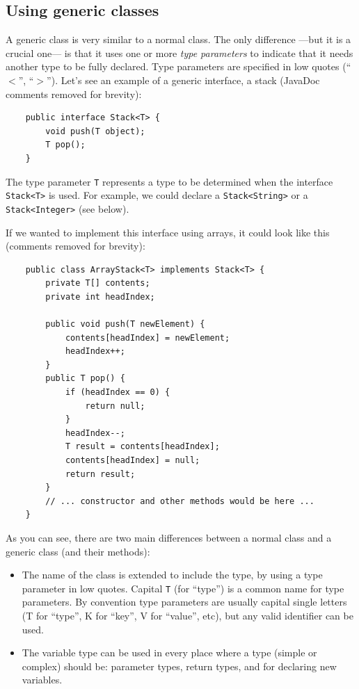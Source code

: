 \subsection{Using generic classes}
\label{sec:using-gener-class}

A generic class is very similar to a normal class. The only
difference ---but it is a crucial one--- is that it uses one or more
\emph{type parameters} to indicate that it needs another type to be
fully declared. Type parameters
are specified in low quotes (``$<$'', ``$>$''). Let's see an
example of a generic interface, a stack (JavaDoc comments removed for
brevity): 

\begin{verbatim}
    public interface Stack<T> {
        void push(T object);
        T pop();
    }
\end{verbatim}

The type parameter \verb+T+ represents a type to be determined when the
interface \verb+Stack<T>+ is used. For example, we could declare a
\verb+Stack<String>+ or a \verb+Stack<Integer>+ (see below). 

If we wanted to implement this interface using arrays, it could look
like this (comments removed for brevity): 

\begin{verbatim}
    public class ArrayStack<T> implements Stack<T> {
        private T[] contents;
        private int headIndex; 

        public void push(T newElement) {
            contents[headIndex] = newElement;
            headIndex++;
        }
        public T pop() {
            if (headIndex == 0) {
                return null;
            }
            headIndex--;
            T result = contents[headIndex];
            contents[headIndex] = null;
            return result;
        }
        // ... constructor and other methods would be here ...
    }
\end{verbatim}

As you can see, there are two main differences between a normal class
and a generic class (and their methods): 

\begin{itemize}
\item The name of the class is extended to include the type, by using
  a type parameter in low quotes. Capital \verb+T+ (for ``type'') is a common
  name for type parameters. By convention type parameters are
  usually capital single letters (T for ``type'', K for ``key'', 
  V for ``value'', etc), but any valid identifier can be
  used.
\item The variable type can be used in every place where a type
  (simple or complex) should be: parameter types, return types, and
  for declaring new variables. 
\end{itemize}

